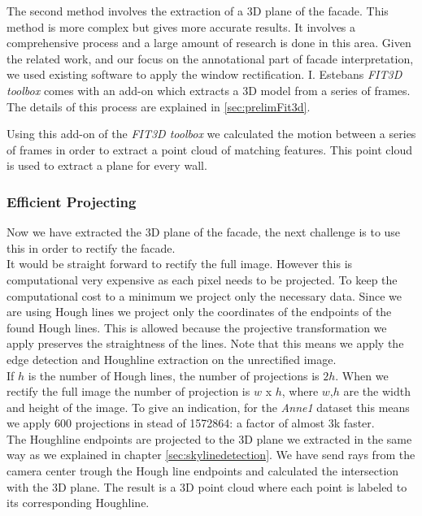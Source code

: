 The second method involves the extraction of a 3D plane of the facade. This 
method is more complex but gives more accurate results. It involves a
comprehensive process and a large amount of research is done in this area. 
Given the related work, and our focus on the annotational part of facade
interpretation, we used existing software to apply the window rectification.
I. Estebans \emph{FIT3D toolbox} \cite{Fit3d} comes with an add-on which extracts a 3D model from a
series of frames.  The details of this process are explained in \ref{sec:prelimFit3d}.

Using this add-on of the \emph{FIT3D toolbox} \cite{Fit3d} we calculated the motion between a
series of frames in order to extract a point cloud of matching features. This
point cloud is used to extract a plane for every wall.


\subsubsection{Efficient Projecting} 
Now we have extracted the 3D plane of the facade, the next challenge is to use this
in order to rectify the facade.\\

It would be straight forward to rectify the full image. However this is
computational very expensive as each pixel needs to be projected. To keep the
computational cost to a minimum we project only the necessary data. Since we
are using Hough lines we project only the coordinates of the endpoints of the found Hough lines. 
This is allowed because the projective transformation we apply preserves the
straightness of the lines. Note that this means we apply the edge detection and
Houghline extraction on the unrectified image.\\

If $h$ is the number of Hough lines, the number of projections is $2h$.
When we rectify the full image the number of projection is $w$ x $h$, where $w$,$h$ are the width and height of
the image. To give an indication, for the \emph{Anne1} dataset 
this means we apply 600 projections in stead of 1572864: a factor of almost 3k faster.\\

The Houghline endpoints are projected to the 3D plane we extracted in the same
way as we explained in chapter \ref{sec:skylinedetection}. We have send
rays from the camera center trough the Hough line endpoints and calculated the
intersection with the 3D plane.  The result is a 3D point cloud where each
point is labeled to its corresponding Houghline.\\

